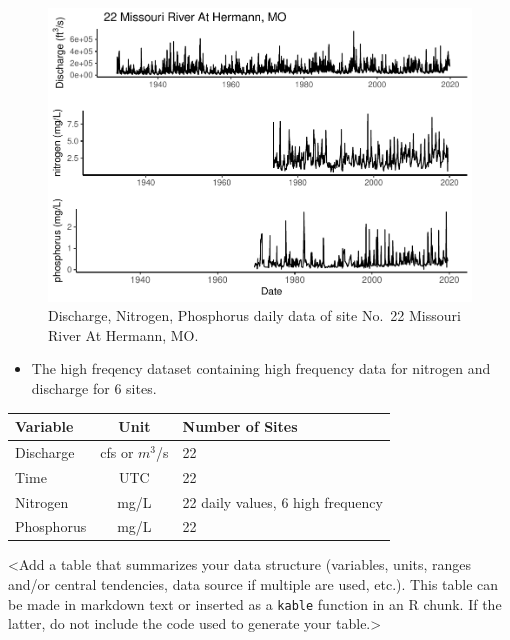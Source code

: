 \documentclass[12pt,]{article}
\providecommand{\tightlist}{%
  \setlength{\itemsep}{0pt}\setlength{\parskip}{0pt}}
\begin{document}
\begin{figure}
\centering
\includegraphics{Missouri-Reasearch-Project---FINAL_files/figure-latex/datawxample-1.pdf}
\caption{\label{fig:dataexample} Discharge, Nitrogen, Phosphorus daily
data of site No.~22 Missouri River At Hermann, MO.}
\end{figure}

\begin{itemize}
\tightlist
\item
  The high freqency dataset containing high frequency data for nitrogen
  and discharge for 6 sites.
\end{itemize}

\begin{longtable}[]{@{}lcl@{}}
\toprule
Variable & Unit & Number of Sites\tabularnewline
\midrule
\endhead
Discharge & cfs or \(m^{3}\)/s & 22\tabularnewline
Time & UTC & 22\tabularnewline
Nitrogen & mg/L & 22 daily values, 6 high frequency\tabularnewline
Phosphorus & mg/L & 22\tabularnewline
\bottomrule
\end{longtable}

\textless{}Add a table that summarizes your data structure (variables,
units, ranges and/or central tendencies, data source if multiple are
used, etc.). This table can be made in markdown text or inserted as a
\texttt{kable} function in an R chunk. If the latter, do not include the
code used to generate your table.\textgreater{}
\end{document}
